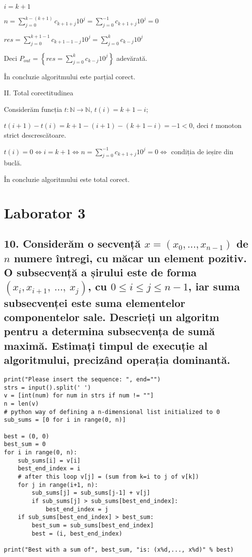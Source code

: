 \documentclass[11pt]{article}
\begin{document}
$i = k + 1$

$n = \sum\limits_{j=0}^{k-(k+1)}c_{k+1+j}10^{j}
= \sum\limits_{j=0}^{-1}c_{k+1+j}10^{j} = 0$

$\mathit{res} = \sum\limits_{j=0}^{k+1-1}c_{k+1-1-j}10^{j}
= \sum\limits_{j=0}^{k}c_{k-j}10^{j}$

Deci $P_{out} = \left\{ \mathit{res} = \sum\limits_{j=0}^{k} c_{k-j}10^{j} \right\} $ adevărată.

În concluzie algoritmului este parțial corect.

\vspace{14pt}
\noindent
II. Total corectitudinea
\newline

Considerăm funcția $t: \mathbb{N} \to \mathbb{N}$, $t(i) = k + 1 - i$;

$t(i + 1) - t(i) = k + 1 - (i + 1) - (k + 1 - i) = -1 < 0$, deci $t$ monoton strict descrescătoare.

$t(i) = 0 \iff i = k + 1 \iff n = \sum\limits_{j=0}^{-1}c_{k+1+j}10^{j} = 0\iff$ condiția de ieșire din buclă.

În concluzie algoritmului este total corect.

\pagebreak

\section*{Laborator 3}
\label{sec:orgae2f2b8}
\subsection*{10. Considerăm o secvență \(x = (x_{0},..., x_{n-1})\) de \(n\) numere întregi, cu măcar un element pozitiv. O subsecvență a șirului este de forma \((x_{i}, x_{i+1},\ ...,\ x_{j})\), cu \(0 \le i \le j \le n - 1\), iar suma subsecvenței este suma elementelor componentelor sale. Descrieți un algoritm pentru a determina subsecvența de sumă maximă. Estimați timpul de execuție al algoritmului, precizând operația dominantă.}
\label{sec:org6ecb3b1}

\begin{verbatim}
print("Please insert the sequence: ", end="")
strs = input().split(' ')
v = [int(num) for num in strs if num != ""]
n = len(v)
# python way of defining a n-dimensional list initialized to 0
sub_sums = [0 for i in range(0, n)]

best = (0, 0)
best_sum = 0
for i in range(0, n):
    sub_sums[i] = v[i]
    best_end_index = i
    # after this loop v[j] = (sum from k=i to j of v[k])
    for j in range(i+1, n):
        sub_sums[j] = sub_sums[j-1] + v[j]
        if sub_sums[j] > sub_sums[best_end_index]:
            best_end_index = j
    if sub_sums[best_end_index] > best_sum:
        best_sum = sub_sums[best_end_index]
        best = (i, best_end_index)

print("Best with a sum of", best_sum, "is: (x%d,..., x%d)" % best)
\end{verbatim}
\end{document}
